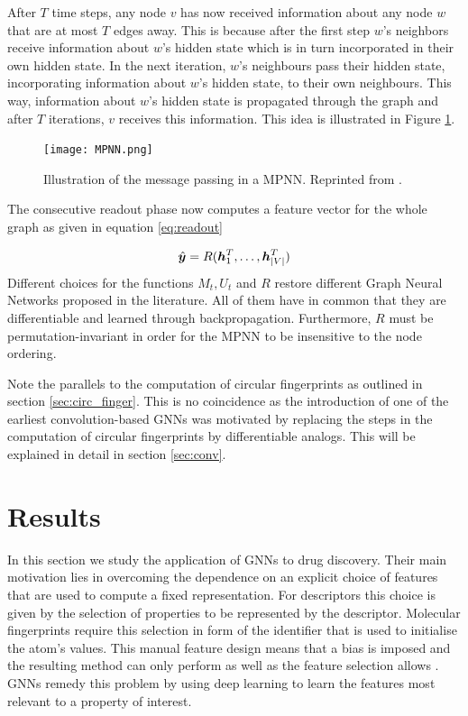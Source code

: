 After $T$ time steps, any node $v$ has now received information about any node $w$ that are at most $T$ edges away. This is because after the first step $w$'s neighbors receive information about $w$'s hidden state which is in turn incorporated in their own hidden state. In the next iteration, $w$'s neighbours pass their hidden state, incorporating information about $w$'s hidden state, to their own neighbours. This way, information about $w$'s hidden state is propagated through the graph and after $T$ iterations, $v$ receives this information. This idea is illustrated in Figure \ref{fig:mpnn}.
\begin{figure}[h]
	\centering 
	\texttt{[image: MPNN.png]}
	\caption{Illustration of the message passing in a MPNN. Reprinted from \cite{mpnn_graphics}. }
	\label{fig:mpnn}
\end{figure}
 
The consecutive readout phase now computes a feature vector for the whole graph as given in equation \ref{eq:readout}

\begin{equation}
\hat{\boldsymbol y} = R(\boldsymbol h_1^T, \ldots, \boldsymbol h_{|V|}^T) \label{eq:readout}
\end{equation}
Different choices for the functions $M_t, U_t$ and $R$ restore different Graph Neural Networks proposed in the literature. All of them have in common that they are differentiable and learned through backpropagation. Furthermore, $R$ must be permutation-invariant in order for the MPNN to be insensitive to the node ordering.

Note the parallels to the computation of circular fingerprints as outlined in section \ref{sec:circ_finger}. This is no coincidence as the introduction of one of the earliest convolution-based GNNs \citep{duvenaud2015convolutional} was motivated by replacing the steps in the computation of circular fingerprints by differentiable analogs. This will be explained in detail in section \ref{sec:conv}.


\section{Results}
\label{sec:results}
In this section we study the application of GNNs to drug discovery. Their main motivation lies in overcoming the dependence on an explicit choice of features that are used to compute a fixed representation. For descriptors this choice is given by the selection of properties to be represented by the descriptor. Molecular fingerprints require this selection in form of the identifier that is used to initialise the atom's values. This manual feature design means that a bias is imposed and the resulting method can only perform as well as the feature selection allows \citep{merkwirth}. GNNs remedy this problem by using deep learning to learn the features most relevant to a property of interest.

